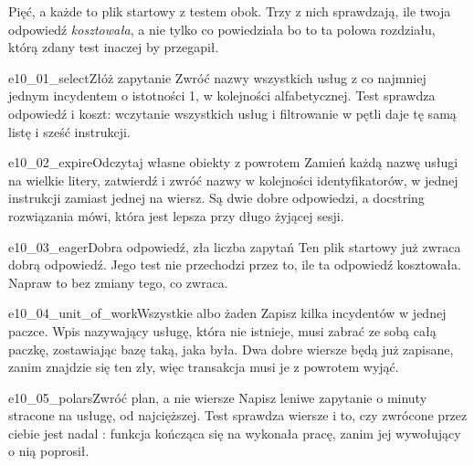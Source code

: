 Pięć, a każde to plik startowy z testem obok. Trzy z nich sprawdzają, ile
twoja odpowiedź \emph{kosztowała}, a nie tylko co powiedziała \dash{} bo to
ta połowa rozdziału, którą zdany test inaczej by przegapił.

\begin{exercise}{e10_01_select}{Złóż zapytanie}
Zwróć nazwy wszystkich usług z co najmniej jednym incydentem o istotności 1,
w kolejności alfabetycznej. Test sprawdza odpowiedź i koszt: wczytanie
wszystkich usług i filtrowanie w pętli daje tę samą listę i sześć
instrukcji.
\end{exercise}

\begin{exercise}{e10_02_expire}{Odczytaj własne obiekty z powrotem}
Zamień każdą nazwę usługi na wielkie litery, zatwierdź i zwróć nazwy w
kolejności identyfikatorów, w jednej instrukcji zamiast jednej na wiersz. Są
dwie dobre odpowiedzi, a docstring rozwiązania mówi, która jest lepsza przy
długo żyjącej sesji.
\end{exercise}

\begin{exercise}{e10_03_eager}{Dobra odpowiedź, zła liczba zapytań}
Ten plik startowy już zwraca dobrą odpowiedź. Jego test nie przechodzi przez
to, ile ta odpowiedź kosztowała. Napraw to bez zmiany tego, co zwraca.
\end{exercise}

\begin{exercise}{e10_04_unit_of_work}{Wszystkie albo żaden}
Zapisz kilka incydentów w jednej paczce. Wpis nazywający usługę, która nie
istnieje, musi zabrać ze sobą całą paczkę, zostawiając bazę taką, jaka była.
Dwa dobre wiersze będą już zapisane, zanim znajdzie się ten zły, więc
transakcja musi je z powrotem wyjąć.
\end{exercise}

\begin{exercise}{e10_05_polars}{Zwróć plan, a nie wiersze}
Napisz leniwe zapytanie o minuty stracone na usługę, od najcięższej. Test
sprawdza wiersze i to, czy zwrócone przez ciebie jest nadal
: funkcja kończąca się na  wykonała pracę,
zanim jej wywołujący o nią poprosił.
\end{exercise}
